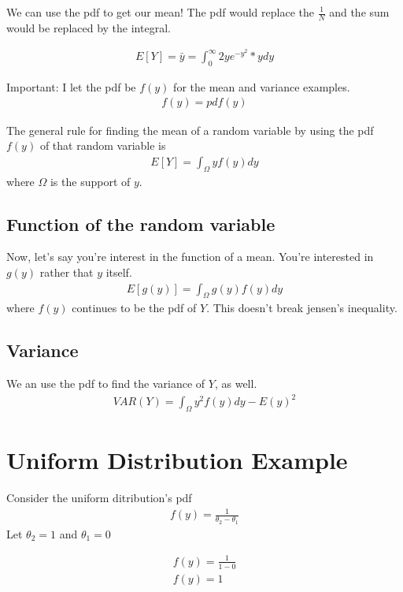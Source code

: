 \documentclass{article}
\begin{document}
We can use the pdf to get our mean! The pdf would replace the $\frac{1}{N}$ and the sum would be replaced by the integral. 

\begin{align}
    E[Y]= \bar y = \int_0^\infty 2ye^{-y^2} * y dy
\end{align}

Important: I let the pdf be $f(y)$ for the mean and variance examples.
\begin{align}
    f(y) = pdf(y)
\end{align}

The general rule for finding the mean of a random variable by using the pdf $f(y)$ of that random variable is 
\begin{align}
    E[Y] = \int_\Omega y f(y) dy
\end{align}
where $\Omega$ is the support of $y$. \\

\subsection{Function of the random variable}

Now, let's say you're interest in the function of a mean. You're interested in $g(y)$ rather that $y$ itself.
\begin{align}
    E[g(y)] = \int_\Omega g(y) f(y) dy
\end{align}
where $f(y)$ continues to be the pdf of $Y$. This doesn't break jensen's inequality.

\subsection{Variance}
We an use the pdf to find the variance of $Y$, as well.
\begin{align}
        VAR(Y) = \int_\Omega y^2 f(y) dy - E(y)^2
\end{align}

\section{Uniform Distribution Example}
Consider the uniform ditribution's pdf 
\begin{align}
    f(y) = \frac{1}{\theta_2 - \theta_1}
\end{align}
Let $\theta_2 = 1$ and $\theta_1 = 0$

\begin{align}
    f(y) = \frac{1}{1 - 0}\\
    f(y) = 1
\end{align}
\end{document}
